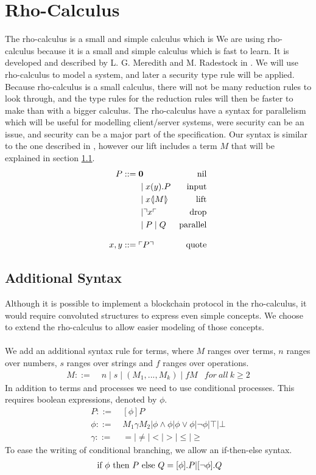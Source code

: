 \section{Rho-Calculus}
The rho-calculus is a small and simple calculus which is We are using rho-calculus because it is a small and simple calculus which is fast to learn.
It is developed and described by L. G. Meredith and M. Radestock in \citep{Meredith2005}.
We will use rho-calculus to model a system, and later a security type rule will be applied.
Because rho-calculus is a small calculus, there will not be many reduction rules to look through, and the type rules for the reduction rules will then be faster to make than with a bigger calculus.
The rho-calculus have a syntax for parallelism which will be useful for modelling client/server systems, were security can be an issue, and security can be a major part of the specification. 
Our syntax is similar to the one described in \citep{Meredith2005}, however our lift includes a term $M$ that will be explained in section \ref{sec:addsyntax}.
\begin{align*}
    P  ::= \; &  \mathbf{0} & \text{nil} \\
      & \mid x(y).P & \text{input} \\
      & \mid x \langle \! | M | \! \rangle & \text{lift} \\
      & \mid \urcorner x \ulcorner & \text{drop} \\
      & \mid P \mid Q & \text{parallel} \\[3mm]
    x,y ::= \; & \ulcorner P \urcorner & \text{quote}\\
\end{align*}



\subsection{Additional Syntax} \label{sec:addsyntax}
Although it is possible to implement a blockchain protocol in the rho-calculus, it would require convoluted structures to express even simple concepts.
We choose to extend the rho-calculus to allow easier modeling of those concepts.\\
\\
We add an additional syntax rule for terms, where $M$ ranges over terms, $n$ ranges over numbers, $s$ ranges over strings and $f$ ranges over operations.
\begin{align*}
M::=\; & n \mid s \mid (M_1,...,M_k) \mid fM &for\ all\ k \geq 2
\end{align*}
In addition to terms and processes we need to use conditional processes. This requires boolean expressions, denoted by \ensuremath{\phi}.
\begin{align*}
P::=& \ [\phi] P\\
\phi ::=& \ M_1\gamma M_2|\phi\land\phi|\phi\lor\phi|\neg\phi|\top|\bot\\
\gamma ::=& \ =|\neq|<|>|\leq|\geq
\end{align*}
To ease the writing of conditional branching, we allow an if-then-else syntax.
\begin{align*}
	\text{ if }\phi\text{ then }P\text{ else }Q = [\phi].P | [\neg \phi].Q
\end{align*}

